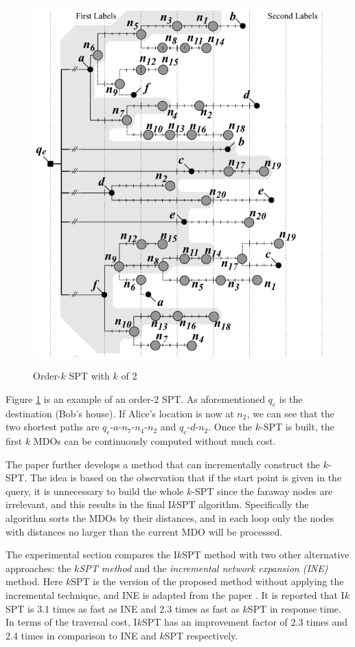 \documentclass[paper=a4, fontsize=18pt]{article} %
\numberwithin{equation}{section} %
\numberwithin{figure}{section} %
\numberwithin{table}{section} %
\begin{document}
\begin{figure}
  \centering
  \includegraphics[width=.6\linewidth]{74_spt.png}\\
  \caption{Order-$k$ SPT with $k$ of 2}\label{fig:spt}
\end{figure}


Figure \ref{fig:spt} is an example of an order-2 SPT. As aforementioned $q_e$ is the destination (Bob's house). If Alice's location is now at $n_2$, we can see that the two shortest paths are $q_e$-$a$-$n_7$-$n_4$-$n_2$ and $q_e$-$d$-$n_2$. Once the $k$-SPT is built, the first $k$ MDOs can be continuously computed without much cost.

The paper further develops a method that can incrementally construct the $k$-SPT. The idea is based on the observation that if the start point is given in the query, it is unnecessary to build the whole $k$-SPT since the faraway nodes are irrelevant, and this results in the final I$k$SPT algorithm. Specifically the algorithm sorts the MDOs by their distances, and in each loop only the nodes with distances no larger than the current MDO will be processed.

The experimental section compares the I$k$SPT method with two other alternative approaches: the \emph{$k$SPT method} and the \emph{incremental network expansion (INE)} method. Here $k$SPT is the version of the proposed method without applying the incremental technique, and INE is adapted from the paper \cite{PZMT03}. It is reported that I$k$SPT is 3.1 times as fast as INE and 2.3 times as fast as $k$SPT in response time. In terms of the traversal cost, I$k$SPT has an improvement factor of 2.3 times and 2.4 times in comparison to INE and $k$SPT respectively.
\end{document}
